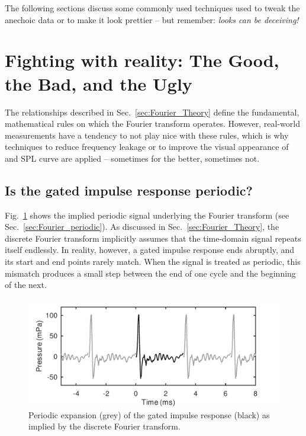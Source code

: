 \documentclass[12pt,a4paper]{article}
\providecommand{\secn}[1]{Sec.~\ref{sec:#1}}
\providecommand{\figlabel}[1]{\label{fig:#1}}
\providecommand{\figr}[1]{Fig.~\ref{fig:#1}}
\begin{document}
The following sections discuss some commonly used techniques used to tweak the anechoic data or to make it look prettier -- but remember: \emph{looks can be deceiving!}


\section{Fighting with reality: The Good, the Bad, and the Ugly}

The relationships described in \secn{Fourier_Theory} define the fundamental, mathematical rules on which the Fourier transform operates. However, real-world measurements have a tendency to not play nice with these rules, which is why techniques to reduce frequency leakage or to improve the visual appearance of and SPL curve are applied -- sometimes for the better, sometimes not.

\subsection{Is the gated impulse response periodic?}

\figr{FIGURE3} shows the implied periodic signal underlying the Fourier transform (see \secn{Fourier_periodic}). As discussed in \secn{Fourier_Theory}, the discrete Fourier transform implicitly assumes that the time-domain signal repeats itself endlessly. In reality, however, a gated impulse response ends abruptly, and its start and end points rarely match. When the signal is treated as periodic, this mismatch produces a small step between the end of one cycle and the beginning of the next.

\begin{figure}[tbp]
  \begin{center}
    \includegraphics[width=\textwidth]{FIGURE3}
    \caption{Periodic expansion (grey) of the gated impulse response (black) as implied by the discrete Fourier transform.}
    \figlabel{FIGURE3}
  \end{center}
\end{figure}
\end{document}
